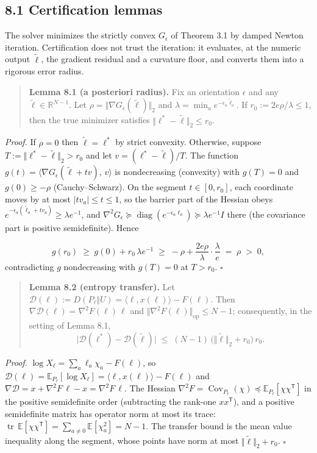 \documentclass[11pt]{article}
\begin{document}
\subsection*{8.1 Certification lemmas}
The solver minimizes the strictly convex $G_\epsilon$ of Theorem 3.1 by damped Newton iteration.  Certification does not trust the iteration: it evaluates, at the numeric output $\tilde\ell$, the gradient residual and a curvature floor, and converts them into a rigorous error radius.

\begin{quote}
\textbf{Lemma 8.1 (a posteriori radius).}  Fix an orientation $\epsilon$ and any $\tilde\ell \in \mathbb{R}^{N-1}$.  Let $\rho = \Vert\nabla G_\epsilon(\tilde\ell)\Vert_2$ and $\lambda = \min_a e^{-\epsilon_a\tilde\ell_a}$.  If $r_0 := 2e\rho/\lambda \le 1$, then the true minimizer satisfies $\Vert\ell^\ast - \tilde\ell\Vert_2 \le r_0$.
\end{quote}
\emph{Proof.}  If $\rho = 0$ then $\tilde\ell = \ell^\ast$ by strict convexity.  Otherwise, suppose $T := \Vert\ell^\ast - \tilde\ell\Vert_2 > r_0$ and let $v = (\ell^\ast - \tilde\ell)/T$.  The function $g(t) = \langle \nabla G_\epsilon(\tilde\ell + tv),\, v\rangle$ is nondecreasing (convexity) with $g(T) = 0$ and $g(0) \ge -\rho$ (Cauchy–Schwarz).  On the segment $t \in [0, r_0]$, each coordinate moves by at most $|t v_a| \le t \le 1$, so the barrier part of the Hessian obeys $e^{-\epsilon_a(\tilde\ell_a + t v_a)} \ge \lambda e^{-1}$, and $\nabla^2 G_\epsilon \succeq \operatorname{diag}(e^{-\epsilon_a \ell_a}) \succeq \lambda e^{-1} I$ there (the covariance part is positive semidefinite).  Hence

\[
g(r_0) \;\ge\; g(0) + r_0\,\lambda e^{-1}
\;\ge\; -\rho + \frac{2e\rho}{\lambda}\cdot\frac{\lambda}{e}
\;=\; \rho \;>\; 0 ,
\]
contradicting $g$ nondecreasing with $g(T) = 0$ at $T > r_0$. $\square$

\begin{quote}
\textbf{Lemma 8.2 (entropy transfer).}  Let $\mathcal D(\ell) := D(P_\ell \Vert U) = \langle \ell, x(\ell)\rangle - F(\ell)$.  Then $\nabla\mathcal D(\ell) = \nabla^2 F(\ell)\,\ell$ and $\Vert\nabla^2 F(\ell)\Vert_{\mathrm{op}} \le N - 1$; consequently, in the setting of Lemma 8.1,
\[
\big|\mathcal D(\ell^\ast) - \mathcal D(\tilde\ell)\big|
\;\le\; (N-1)\,\big(\Vert\tilde\ell\Vert_2 + r_0\big)\, r_0 .
\]
\end{quote}
\emph{Proof.}  $\log X_\ell = \sum_a \ell_a\chi_a - F(\ell)$, so $\mathcal D(\ell) = \mathbb{E}_{P_\ell}[\log X_\ell] = \langle\ell, x(\ell)\rangle - F(\ell)$ and $\nabla \mathcal D = x + \nabla^2 F\,\ell - x = \nabla^2 F\,\ell$. The Hessian $\nabla^2 F = \operatorname{Cov}_{P_\ell}(\chi) \preceq \mathbb{E}_{P_\ell}[\chi\chi^{\mathsf T}]$ in the positive semidefinite order (subtracting the rank-one $xx^{\mathsf T}$), and a positive semidefinite matrix has operator norm at most its trace: $\operatorname{tr}\,\mathbb{E}[\chi\chi^{\mathsf T}] = \sum_{a\ne0}\mathbb{E}[\chi_a^2] = N-1$.  The transfer bound is the mean value inequality along the segment, whose points have norm at most $\Vert\tilde\ell\Vert_2 + r_0$.  $\square$
\end{document}
